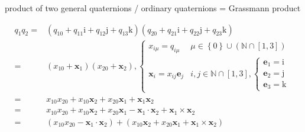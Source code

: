 \documentclass[
]{book}
\theoremstyle{definition}
\theoremstyle{definition}
\theoremstyle{definition}
\theoremstyle{definition}
\theoremstyle{remark}
\begin{document}
product of two general quaternions / ordinary quaternions = Grassmann product

\[
\begin{aligned}
q_{{\scriptscriptstyle 1}}q_{{\scriptscriptstyle 2}}= & \left(q_{{\scriptscriptstyle 10}}+q_{{\scriptscriptstyle 11}}\mathrm{i}+q_{{\scriptscriptstyle 12}}\mathrm{j}+q_{{\scriptscriptstyle 13}}\mathrm{k}\right)\left(q_{{\scriptscriptstyle 20}}+q_{{\scriptscriptstyle 21}}\mathrm{i}+q_{{\scriptscriptstyle 22}}\mathrm{j}+q_{{\scriptscriptstyle 23}}\mathrm{k}\right)\\
= & \left(x_{{\scriptscriptstyle 10}}+\boldsymbol{x}_{{\scriptscriptstyle 1}}\right)\left(x_{{\scriptscriptstyle 20}}+\boldsymbol{x}_{{\scriptscriptstyle 2}}\right),\begin{cases}
x_{{\scriptscriptstyle i\mu}}=q_{{\scriptscriptstyle i\mu}} & \mu\in\left\{ 0\right\} \cup\left(\mathbb{N}\cap\left[1,3\right]\right)\\
\boldsymbol{x}_{{\scriptscriptstyle i}}=x_{{\scriptscriptstyle ij}}\boldsymbol{e}_{{\scriptscriptstyle j}} & i,j\in\mathbb{N}\cap\left[1,3\right],\begin{cases}
\boldsymbol{e}_{{\scriptscriptstyle 1}}=\mathrm{i}\\
\boldsymbol{e}_{{\scriptscriptstyle 2}}=\mathrm{j}\\
\boldsymbol{e}_{{\scriptscriptstyle 3}}=\mathrm{k}
\end{cases}
\end{cases}\\
= & x_{{\scriptscriptstyle 10}}x_{{\scriptscriptstyle 20}}+x_{{\scriptscriptstyle 10}}\boldsymbol{x}_{{\scriptscriptstyle 2}}+x_{{\scriptscriptstyle 20}}\boldsymbol{x}_{{\scriptscriptstyle 1}}+\boldsymbol{x}_{{\scriptscriptstyle 1}}\boldsymbol{x}_{{\scriptscriptstyle 2}}\\
= & x_{{\scriptscriptstyle 10}}x_{{\scriptscriptstyle 20}}+x_{{\scriptscriptstyle 10}}\boldsymbol{x}_{{\scriptscriptstyle 2}}+x_{{\scriptscriptstyle 20}}\boldsymbol{x}_{{\scriptscriptstyle 1}}-\boldsymbol{x}_{{\scriptscriptstyle 1}}\cdot\boldsymbol{x}_{{\scriptscriptstyle 2}}+\boldsymbol{x}_{{\scriptscriptstyle 1}}\times\boldsymbol{x}_{{\scriptscriptstyle 2}}\\
= & \left(x_{{\scriptscriptstyle 10}}x_{{\scriptscriptstyle 20}}-\boldsymbol{x}_{{\scriptscriptstyle 1}}\cdot\boldsymbol{x}_{{\scriptscriptstyle 2}}\right)+\left(x_{{\scriptscriptstyle 10}}\boldsymbol{x}_{{\scriptscriptstyle 2}}+x_{{\scriptscriptstyle 20}}\boldsymbol{x}_{{\scriptscriptstyle 1}}+\boldsymbol{x}_{{\scriptscriptstyle 1}}\times\boldsymbol{x}_{{\scriptscriptstyle 2}}\right)\\

\end{aligned}\]
\end{document}
